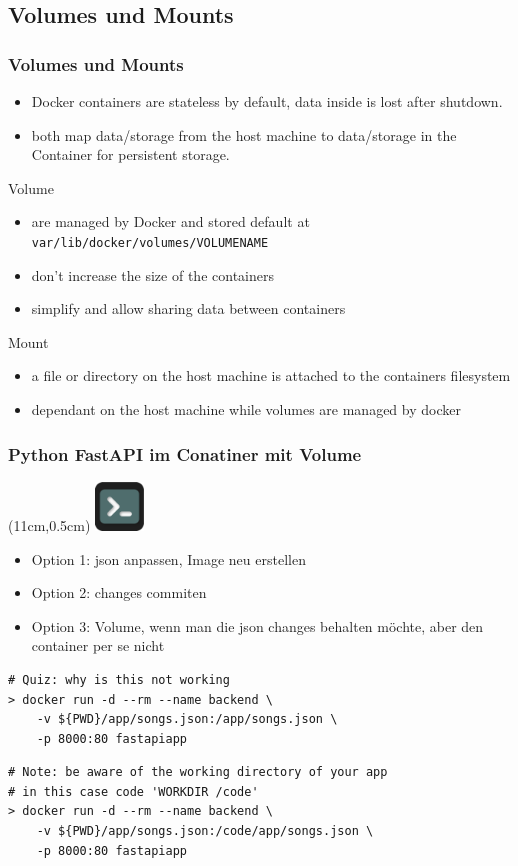 \documentclass[22pt]{beamer}
\newcommand{\code}[1]{\colorbox{gray!10}{\texttt{#1}}}
\newcommand{\terminal}{
    \begin{textblock*}{1.3cm}(11cm,0.5cm) %
    \includegraphics[width=1.3cm]{Bilder/terminal2.png}
    \end{textblock*}
}
\begin{document}
\subsection{Volumes und Mounts}
\begin{frame}[t]
    \frametitle{Volumes und Mounts}
    \begin{itemize}
        \item Docker containers are stateless by default, data inside is lost after shutdown.
        \item both map data/storage from the host machine to data/storage in the Container for persistent storage.
    \end{itemize} \pause
    \begin{block}{Volume}
        \begin{itemize}
            \item are managed by Docker and stored default at \code{var/lib/docker/volumes/VOLUMENAME}
            \item don't increase the size of the containers
            \item simplify and allow sharing data between containers
        \end{itemize}
    \end{block} \pause
    \begin{block}{Mount}
        \begin{itemize}
            \item a file or directory on the host machine is attached to the containers filesystem
            \item dependant on the host machine while volumes are managed by docker
        \end{itemize}
    \end{block}
\end{frame}

\begin{frame}[fragile]
    \frametitle{Python FastAPI im Conatiner mit Volume}
    \terminal
    \begin{itemize}
        \item Option 1: json anpassen, Image neu erstellen
        \item Option 2: changes commiten
        \item Option 3: Volume, wenn man die json changes behalten möchte, aber den container per se nicht
    \end{itemize}

\begin{verbatim}
# Quiz: why is this not working
> docker run -d --rm --name backend \
    -v ${PWD}/app/songs.json:/app/songs.json \
    -p 8000:80 fastapiapp
\end{verbatim}
    \pause
\begin{verbatim}
# Note: be aware of the working directory of your app
# in this case code 'WORKDIR /code'
> docker run -d --rm --name backend \
    -v ${PWD}/app/songs.json:/code/app/songs.json \
    -p 8000:80 fastapiapp    
\end{verbatim}
            
\end{frame}
\end{document}
